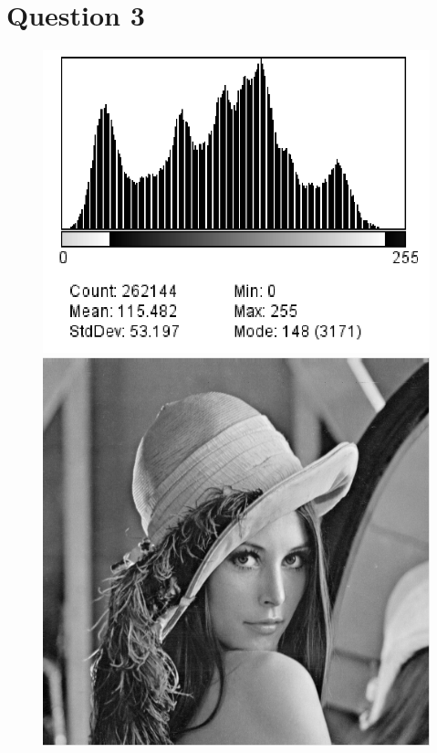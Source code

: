 \documentclass[a4paper,12pt]{report}
\begin{document}
\section*{Question 3}


\begin{figure}[!ht]
	\center
	\includegraphics[scale=0.4]{image/histo_q3.png}
	\includegraphics[scale=0.4]{image/image_q3.png}
\end{figure}
\end{document}
